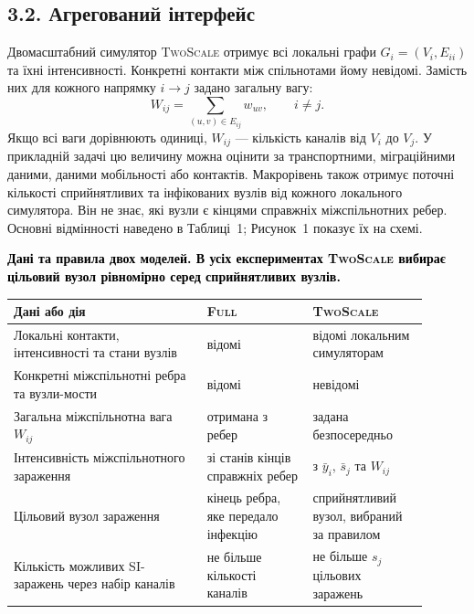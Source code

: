 ﻿\documentclass[11pt,a4paper]{article}
\newcommand{\ibar}{\bar{y}}
\newcommand{\sbar}{\bar{s}}
\newcommand{\Full}{\textup{\textsc{Full}}}
\newcommand{\TS}{\textup{\textsc{TwoScale}}}
\begin{document}
\subsection*{3.2. Агрегований інтерфейс}
Двомасштабний симулятор \TS{} отримує всі локальні графи $G_i=(V_i,E_{ii})$ та їхні інтенсивності. Конкретні контакти між спільнотами йому невідомі. Замість них для кожного напрямку $i\to j$ задано загальну вагу:
\begin{equation*}W_{ij}=\sum_{(u,v)\in E_{ij}}w_{uv},\qquad i\neq j.\tag{3}
\end{equation*}
Якщо всі ваги дорівнюють одиниці, $W_{ij}$ --- кількість каналів від $V_i$ до $V_j$. У прикладній задачі цю величину можна оцінити за транспортними, міграційними даними, даними мобільності або контактів. Макрорівень також отримує поточні кількості сприйнятливих та інфікованих вузлів від кожного локального симулятора. Він не знає, які вузли є кінцями справжніх міжспільнотних ребер. Основні відмінності наведено в Таблиці~1; Рисунок~1 показує їх на схемі.
\par\noindent\begin{minipage}{\linewidth}
\color{black}\centering
\par\small\textbf{\textcolor{black}{Дані та правила двох моделей. В усіх експериментах \TS{} вибирає цільовий вузол рівномірно серед сприйнятливих вузлів.}}

\small
\setlength{\tabcolsep}{3pt}\begin{tabular}{>{\raggedright\arraybackslash}p{0.42\linewidth}>{\raggedright\arraybackslash}p{0.23\linewidth}>{\raggedright\arraybackslash}p{0.25\linewidth}}
\toprule
Дані або дія & \Full{} & \TS{}\\
\midrule
Локальні контакти, інтенсивності та стани вузлів & відомі & відомі локальним симуляторам\\
Конкретні міжспільнотні ребра та вузли-мости & відомі & невідомі\\
Загальна міжспільнотна вага $W_{ij}$ & отримана з ребер & задана безпосередньо\\
Інтенсивність міжспільнотного зараження & зі станів кінців справжніх ребер & з $\ibar_i$, $\sbar_j$ та $W_{ij}$\\
Цільовий вузол зараження & кінець ребра, яке передало інфекцію & сприйнятливий вузол, вибраний за правилом\\
Кількість можливих SI-заражень через набір каналів & не більше кількості каналів & не більше $s_j$ цільових заражень\\
\bottomrule
\end{tabular}
\end{minipage}\par
\end{document}
